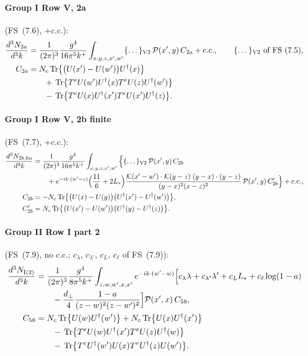 \documentclass[10pt]{article}
\numberwithin{equation}{section}
\newcommand{\Ls}{L_{*}}
\newcommand{\KK}{\mathcal K}
\newcommand{\PP}{\mathcal P}
\newcommand{\pre}{\frac{1}{(2\pi)^3}}
\newcommand{\phw}{e^{-ik\cdot(w'-w)}}
\begin{document}
\paragraph{Group I Row V, 2a} (FS~(7.6), $+$c.c.):
\begin{align}
\frac{d^3N_{2a}}{d^3k}&=\pre\frac{g^4}{16\pi^5k^+}\int_{x,y,z,x',w'}\{\dots\}_{\rm V2}\,\PP(x',y)\,C_{2a}+{\rm c.c.},\qquad\{\dots\}_{\rm V2}\ \text{of FS~(7.5)},\label{eq:s2a}\\
C_{2a}&=N_c\,{\rm Tr}\big\{\big(U(x')-U(w')\big)U^\dagger(x)\big\}\notag\\
&\qquad+\,{\rm Tr}\big\{T^eU(w')U^\dagger(x)T^eU(z)U^\dagger(w')\big\}\notag\\
&\qquad-\,{\rm Tr}\big\{T^eU(x)U^\dagger(x')T^eU(x')U^\dagger(z)\big\}.\notag
\end{align}
\paragraph{Group I Row V, 2b finite} (FS~(7.7), $+$c.c.):
\begin{align}
\frac{d^3N_{2b,\rm fin}}{d^3k}&=\pre\frac{g^4}{16\pi^5k^+}\int_{x,y,z,x',w'}\Big\{\{\dots\}_{\rm V2}\,\PP(x',y)\,C_{2b}\notag\\
&\qquad+e^{-ik\cdot(w'-z)}\Big(\frac{11}{6}+2\Ls\Big)\frac{\KK(x'-w')\cdot\KK(y-z)\;(y-x)\cdot(y-z)}{(y-x)^2(x-z)^2}\,\PP(x',y)\,C_{2b}'\Big\}+{\rm c.c.},\label{eq:s2b}\\
C_{2b}&=-N_c\,{\rm Tr}\big\{\big(U(x)-U(y)\big)\big(U^\dagger(x')-U^\dagger(w')\big)\big\},\notag\\
C_{2b}'&=N_c\,{\rm Tr}\big\{\big(U(x')-U(w')\big)\big(U^\dagger(y)-U^\dagger(z)\big)\big\}.\notag
\end{align}
\paragraph{Group II Row I part 2} (FS~(7.9), no c.c.; $c_\lambda$, $c_{\lambda'}$, $c_L$, $c_\ell$ of FS~(7.9)):
\begin{align}
\frac{d^3N_{\rm I(2)}}{d^3k}&=\pre\frac{g^4}{8\pi^5k^+}\int_{z,w,w',x,x'}\phw\Big[c_\lambda\lambda+c_{\lambda'}\lambda'+c_L\Ls+c_\ell\log(1-a)\notag\\
&\qquad-\frac{d_\perp}{4}\frac{1-a}{(z-w)^2(z-w')^2}\Big]\PP(x',x)\,C_{58},\label{eq:s58}\\
C_{58}&=N_c\,{\rm Tr}\big\{U(w)U^\dagger(w')\big\}+N_c\,{\rm Tr}\big\{U(x)U^\dagger(x')\big\}\notag\\
&\qquad-\,{\rm Tr}\big\{T^eU(w)U^\dagger(x')T^eU(z)U^\dagger(w)\big\}\notag\\
&\qquad-\,{\rm Tr}\big\{T^eU^\dagger(w')U(x)T^eU^\dagger(z)U(w')\big\}.\notag
\end{align}
\end{document}
